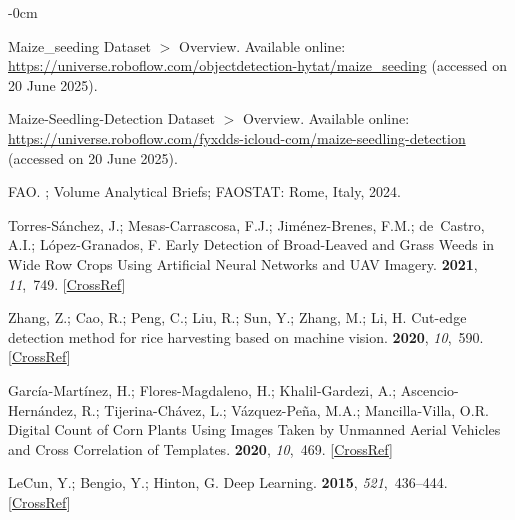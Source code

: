 \documentclass[12pt,a4paper,oneside]{report}
\newlength{\extralength}
\begin{document}
\begin{adjustwidth}{-\extralength}{0cm}
\begin{thebibliography}{999}
Maize\_seeding {{Dataset}} {$>$} {{Overview}}.
\newblock Available online: \url{https://universe.roboflow.com/objectdetection-hytat/maize\_seeding} (accessed on 
20 June 2025).


Maize-Seedling-Detection {{Dataset}} {$>$} {{Overview}}.
\newblock
Available online: \url{https://universe.roboflow.com/fyxdds-icloud-com/maize-seedling-detection} (accessed on 20 June 2025).

{FAO}.
; Volume Analytical Briefs; FAOSTAT:
Rome, Italy, 2024.

Torres-Sánchez, J.; Mesas-Carrascosa, F.J.; Jiménez-Brenes, F.M.; de~Castro,
A.I.; López-Granados, F.
\newblock Early {Detection} of {Broad}-{Leaved} and {Grass} {Weeds} in {Wide}
{Row} {Crops} {Using} {Artificial} {Neural} {Networks} and {UAV} {Imagery}.
 {\bf 2021}, {\em 11},~749. [\href{http://dx.doi.org/10.3390/agronomy11040749}{CrossRef}]

Zhang, Z.; Cao, R.; Peng, C.; Liu, R.; Sun, Y.; Zhang, M.; Li, H.
\newblock Cut-edge detection method for rice harvesting based on machine
vision.
 {\bf 2020}, {\em 10},~590. [\href{http://dx.doi.org/10.3390/agronomy10040590}{CrossRef}]

{Garc{\'i}a-Mart{\'i}nez}, H.; {Flores-Magdaleno}, H.; {Khalil-Gardezi}, A.;
{Ascencio-Hern{\'a}ndez}, R.; {Tijerina-Ch{\'a}vez}, L.;
{V{\'a}zquez-Pe{\~n}a}, M.A.; {Mancilla-Villa}, O.R.
\newblock Digital {{Count}} of {{Corn Plants Using Images Taken}} by {{Unmanned
Aerial Vehicles}} and {{Cross Correlation}} of {{Templates}}.
 {\bf 2020}, {\em 10},~469. [\href{http://dx.doi.org/10.3390/agronomy10040469}{CrossRef}]

LeCun, Y.; Bengio, Y.; Hinton, G.
\newblock Deep Learning.
 {\bf 2015}, {\em 521},~436--444. [\href{http://dx.doi.org/10.1038/nature14539}{CrossRef}]


\end{thebibliography}
\end{adjustwidth}
\end{document}
